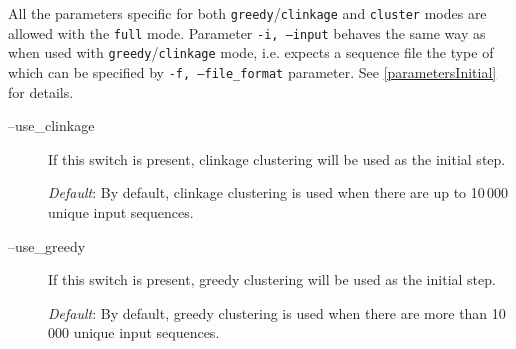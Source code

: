 \documentclass[11pt, a4paper, twoside, titlepage]{article}
\begin{document}
All the parameters specific for both \texttt{greedy}/\texttt{clinkage} and \texttt{cluster} modes are allowed with the \texttt{full} mode. Parameter \texttt{-i, --input} behaves the same way as when used with \texttt{greedy}/\texttt{clinkage} mode, i.e. expects a sequence file the type of which can be specified by \texttt{-f, --file\_format} parameter. See \ref{parametersInitial} for details. 
\begin{description}
\item[--use\_clinkage] If this switch is present, clinkage clustering will be used as the initial step. 
	  	  	  	
	  	  	  	\textit{Default}: By default, clinkage clustering is used when there are up to 10\,000 unique input sequences.
	  	  	  	
	  	  	  	\item[--use\_greedy] If this switch is present, greedy clustering will be used as the initial step. 
	  	  	  	
	  	  	  	\textit{Default}: By default, greedy clustering is used when there are more than 10\,000 unique input sequences.
	  	  	  	\end{description}
\end{document}
